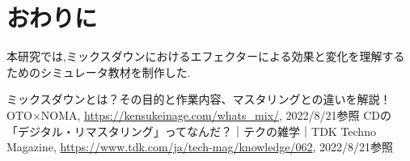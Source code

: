 \documentclass[twocolumn,10pt,a4j]{ltjsarticle}
\begin{document}
\section{おわりに}
本研究では,ミックスダウンにおけるエフェクターによる効果と変化を理解するためのシミュレータ教材を制作した.

\begin{thebibliography}{99}
 ミックスダウンとは？その目的と作業内容、マスタリングとの違いを解説！  OTO×NOMA, \url{https://kensukeinage.com/whats_mix/}, 2022/8/21参照
 CDの「デジタル・リマスタリング」ってなんだ？｜テクの雑学｜TDK Techno Magazine, \url{https://www.tdk.com/ja/tech-mag/knowledge/062}, 2022/8/21参照
\end{thebibliography}
\end{document}
